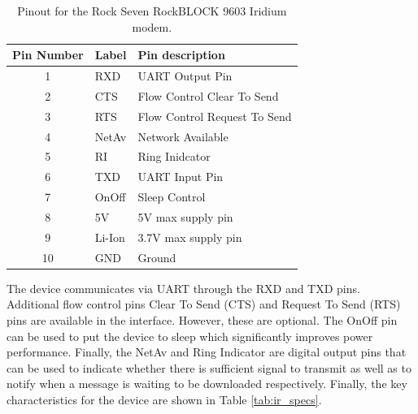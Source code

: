 \begin{table}[H]
	\centering
	\caption{Pinout for the Rock Seven RockBLOCK 9603 Iridium modem.}
	\setlength{\extrarowheight}{5pt}
	\begin{tabular}{c l l}
		\hline
		\textbf{Pin Number} & \textbf{Label} & \textbf{Pin description}\\
		\hline
		\hline
		1 & RXD & UART Output Pin \\
		
		2 & CTS & Flow Control Clear To Send\\
		3 & RTS & Flow Control Request To Send\\
		4 & NetAv & Network Available \\
		5 & RI & Ring Inidcator \\
		6 & TXD & UART Input Pin \\
		7 & OnOff & Sleep Control\\
		8 & 5V & 5V max supply pin \\
		9 & Li-Ion & 3.7V max supply pin \\
		10 & GND & Ground \\
		\hline
		\hline
	\end{tabular}
	
	\label{tab:ir_pinout}
\end{table}

The device communicates via UART through the RXD and TXD pins. Additional flow control pins Clear To Send (CTS) and Request To Send (RTS) pins are available in the interface. However, these are optional. The OnOff pin can be used to put the device to sleep which significantly improves power performance. Finally, the NetAv and Ring Indicator are digital output pins that can be used to indicate whether there is sufficient signal to transmit as well as to notify when a message is waiting to be downloaded respectively.  Finally, the key characteristics for the device are shown in Table \ref{tab:ir_specs}.

